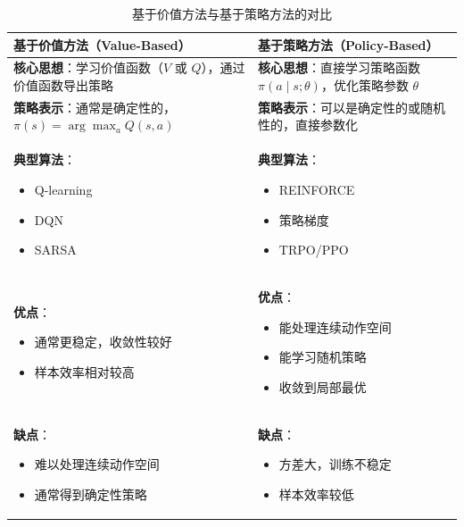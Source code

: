 \begin{table}[H]
\centering
\caption{基于价值方法与基于策略方法的对比}
\begin{tabular}{p{}p{}}
\toprule
\textbf{基于价值方法（Value-Based）} & \textbf{基于策略方法（Policy-Based）} \\
\midrule
\textbf{核心思想}：学习价值函数（$V$ 或 $Q$），通过价值函数导出策略 & \textbf{核心思想}：直接学习策略函数 $\pi(a \mid s; \theta)$，优化策略参数 $\theta$ \\
\hline
\textbf{策略表示}：通常是确定性的，$\pi(s) = \arg\max_a Q(s, a)$ & \textbf{策略表示}：可以是确定性的或随机性的，直接参数化 \\
\hline
\textbf{典型算法}：
\begin{itemize}
    \item Q-learning
    \item DQN
    \item SARSA
\end{itemize} & \textbf{典型算法}：
\begin{itemize}
    \item REINFORCE
    \item 策略梯度
    \item TRPO/PPO
\end{itemize} \\
\hline
\textbf{优点}：
\begin{itemize}
    \item 通常更稳定，收敛性较好
    \item 样本效率相对较高
\end{itemize} & \textbf{优点}：
\begin{itemize}
    \item 能处理连续动作空间
    \item 能学习随机策略
    \item 收敛到局部最优
\end{itemize} \\
\hline
\textbf{缺点}：
\begin{itemize}
    \item 难以处理连续动作空间
    \item 通常得到确定性策略
\end{itemize} & \textbf{缺点}：
\begin{itemize}
    \item 方差大，训练不稳定
    \item 样本效率较低
\end{itemize} \\
\bottomrule
\end{tabular}
\end{table}

